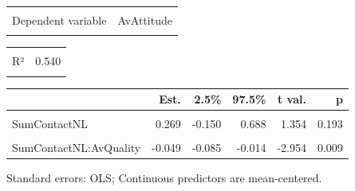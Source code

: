 \begin{table}[!h]
\centering
\begin{tabular}{lr}
\toprule
\cellcolor{gray!6}{Observations} & \cellcolor{gray!6}{21 (2 missing obs. deleted)}\\
Dependent variable & AvAttitude\\
\cellcolor{gray!6}{Type} & \cellcolor{gray!6}{OLS linear regression}\\
\bottomrule
\end{tabular}
\end{table} \begin{table}[!h]
\centering
\begin{tabular}{lr}
\toprule
\cellcolor{gray!6}{F(3,17)} & \cellcolor{gray!6}{6.663}\\
R² & 0.540\\
\cellcolor{gray!6}{Adj. R²} & \cellcolor{gray!6}{0.459}\\
\bottomrule
\end{tabular}
\end{table} \begin{table}[!h]
\centering
\begin{threeparttable}
\begin{tabular}{lrrrrr}
\toprule
  & Est. & 2.5\% & 97.5\% & t val. & p\\
\midrule
\cellcolor{gray!6}{(Intercept)} & \cellcolor{gray!6}{70.930} & \cellcolor{gray!6}{66.519} & \cellcolor{gray!6}{75.341} & \cellcolor{gray!6}{33.927} & \cellcolor{gray!6}{0.000}\\
SumContactNL & 0.269 & -0.150 & 0.688 & 1.354 & 0.193\\
\cellcolor{gray!6}{AvQuality} & \cellcolor{gray!6}{0.765} & \cellcolor{gray!6}{0.288} & \cellcolor{gray!6}{1.242} & \cellcolor{gray!6}{3.385} & \cellcolor{gray!6}{0.004}\\
SumContactNL:AvQuality & -0.049 & -0.085 & -0.014 & -2.954 & 0.009\\
\bottomrule
\end{tabular}
\begin{tablenotes}
\item Standard errors: OLS; Continuous predictors are mean-centered.
\end{tablenotes}
\end{threeparttable}
\end{table}


